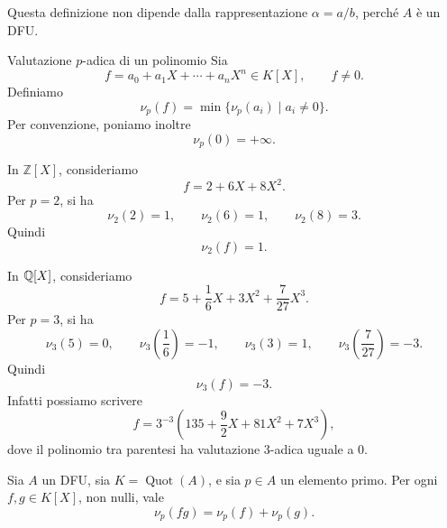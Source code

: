 \documentclass[a4paper]{article}
\begin{document}
\begin{radioactive}
Questa definizione non dipende dalla rappresentazione \(\alpha=a/b\), perché \(A\) è un DFU.
\end{radioactive}

\begin{radioactive}
\begin{snippetdefinition}{Valutazione \(p\)-adica di un polinomio}
    Sia
    \[
        f=a_0+a_1X+\cdots+a_nX^n\in K[X],
        \qquad
        f\neq 0.
    \]
    Definiamo
    \[
        \nu_p(f)
        =
        \min\{\nu_p(a_i)\mid a_i\neq 0\}.
    \]
    Per convenzione, poniamo inoltre
    \[
        \nu_p(0)=+\infty.
    \]
\end{snippetdefinition}
\end{radioactive}

\begin{radioactive}
\begin{snippetexample}{}
    In \(\mathbb{Z}[X]\), consideriamo
    \[
        f=2+6X+8X^2.
    \]
    Per \(p=2\), si ha
    \[
        \nu_2(2)=1,
        \qquad
        \nu_2(6)=1,
        \qquad
        \nu_2(8)=3.
    \]
    Quindi
    \[
        \nu_2(f)=1.
    \]
\end{snippetexample}
\end{radioactive}

\begin{radioactive}
\begin{snippetexample}{}
    In \(\mathbb{Q}[X]\), consideriamo
    \[
        f=5+\frac{1}{6}X+3X^2+\frac{7}{27}X^3.
    \]
    Per \(p=3\), si ha
    \[
        \nu_3(5)=0,
        \qquad
        \nu_3\left(\frac{1}{6}\right)=-1,
        \qquad
        \nu_3(3)=1,
        \qquad
        \nu_3\left(\frac{7}{27}\right)=-3.
    \]
    Quindi
    \[
        \nu_3(f)=-3.
    \]
    Infatti possiamo scrivere
    \[
        f
        =
        3^{-3}\left(135+\frac{9}{2}X+81X^2+7X^3\right),
    \]
    dove il polinomio tra parentesi ha valutazione \(3\)-adica uguale a \(0\).
\end{snippetexample}
\end{radioactive}

\begin{radioactive}
\begin{snippetlemma}{}
    Sia \(A\) un DFU, sia \(K=\operatorname{Quot}(A)\), e sia \(p\in A\) un elemento primo.
    Per ogni \(f,g\in K[X]\), non nulli, vale
    \[
        \nu_p(fg)=\nu_p(f)+\nu_p(g).
    \]
\end{snippetlemma}
\end{radioactive}
\end{document}
